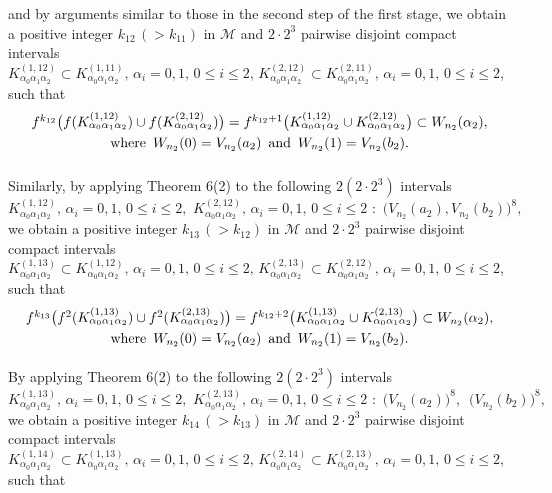 \documentclass[12pt]{article}
\newcommand{\al}{\alpha}
\begin{document}
and by arguments similar to those in the second step of the first stage, we obtain a positive integer $k_{12} \, (> k_{11})$ in $\mathcal M$ and $2 \cdot 2^3$ pairwise disjoint compact intervals $K_{\al_0\al_1\al_2}^{(1,12)} \subset K_{\al_0\al_1\al_2}^{(1,11)}, \, \al_i = 0, 1, \, 0 \le i \le 2, \, K_{\al_0\al_1\al_2}^{(2,12)} \subset K_{\al_0\al_1\al_2}^{(2,11)}, \, \al_i = 0, 1, \, 0 \le i \le 2$, such that 
\begin{multline*}
$$
f^{k_{12}}\big(f(K_{\al_0\al_1\al_2}^{(1,12)}) \cup f(K_{\al_0\al_1\al_2}^{(2,12)})\big) = f^{k_{12}+1}\big(K_{\al_0\al_1\al_2}^{(1,12)} \cup K_{\al_0\al_1\al_2}^{(2,12)}\big) \subset W_{n_2}(\al_2), \\ \text{where} \,\,\, W_{n_2}(0) = V_{n_2}(a_2) \,\,\, \text{and} \,\,\, W_{n_2}(1) = V_{n_2}(b_2).\vspace{.15in}
$$
\end{multline*}
\indent Similarly, by applying Theorem 6(2) to the following $2(2 \cdot 2^3)$ intervals 
$$
K_{\al_0\al_1\al_2}^{(1,12)}, \, \al_i = 0, 1, \, 0 \le i \le 2, \,\, K_{\al_0\al_1\al_2}^{(2,12)}, \, \al_i = 0, 1, \, 0 \le i \le 2 \,\, : \,\, \big(V_{n_2}(a_2), V_{n_2}(b_2)\big)^8,
$$
we obtain a positive integer $k_{13} \, (> k_{12})$ in $\mathcal M$ and $2 \cdot 2^3$ pairwise disjoint compact intervals $K_{\al_0\al_1\al_2}^{(1,13)} \subset K_{\al_0\al_1\al_2}^{(1,12)}, \, \al_i = 0, 1, \, 0 \le i \le 2, \, K_{\al_0\al_1\al_2}^{(2,13)} \subset K_{\al_0\al_1\al_2}^{(2,12)}, \, \al_i = 0, 1, \, 0 \le i \le 2$, such that 
\begin{multline*}
$$
f^{k_{13}}\big(f^2(K_{\al_0\al_1\al_2}^{(1,13)}) \cup f^2(K_{\al_0\al_1\al_2}^{(2,13)})\big) = f^{k_{12}+2}\big(K_{\al_0\al_1\al_2}^{(1,13)} \cup K_{\al_0\al_1\al_2}^{(2,13)}\big) \subset W_{n_2}(\al_2), \\ \text{where} \,\,\, W_{n_2}(0) = V_{n_2}(a_2) \,\,\, \text{and} \,\,\, W_{n_2}(1) = V_{n_2}(b_2).\vspace{.1in}
$$
\end{multline*}
\indent By applying Theorem 6(2) to the following $2(2 \cdot 2^3)$ intervals 
$$
K_{\al_0\al_1\al_2}^{(1,13)}, \, \al_i = 0, 1, \, 0 \le i \le 2, \,\, K_{\al_0\al_1\al_2}^{(2,13)}, \, \al_i = 0, 1, \, 0 \le i \le 2 \,\, : \,\, \big(V_{n_2}(a_2)\big)^8, \,\,\, \big(V_{n_2}(b_2)\big)^8,
$$
we obtain a positive integer $k_{14} \, (> k_{13})$ in $\mathcal M$ and $2 \cdot 2^3$ pairwise disjoint compact intervals $K_{\al_0\al_1\al_2}^{(1,14)} \subset K_{\al_0\al_1\al_2}^{(1,13)}, \, \al_i = 0, 1, \, 0 \le i \le 2, \, K_{\al_0\al_1\al_2}^{(2,14)} \subset K_{\al_0\al_1\al_2}^{(2,13)}, \, \al_i = 0, 1, \, 0 \le i \le 2$, such that 
\end{document}
